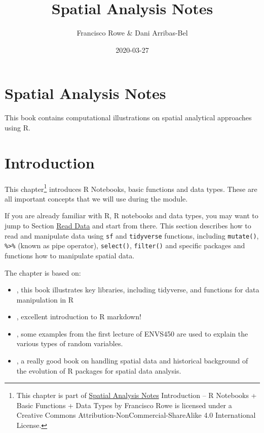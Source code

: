 \documentclass[]{book}
\title{Spatial Analysis Notes}
\author{Francisco Rowe \& Dani Arribas-Bel}
\date{2020-03-27}
\begin{document}
\maketitle

{
\setcounter{tocdepth}{1}
\tableofcontents
}
\chapter{Spatial Analysis Notes}\label{spatial-analysis-notes}

This book contains computational illustrations on spatial analytical
approaches using R.

\chapter{Introduction}\label{intro}

This chapter\footnote{This chapter is part of \href{index.html}{Spatial
  Analysis Notes} {Introduction -- R Notebooks + Basic Functions + Data
  Types} by Francisco Rowe is licensed under a Creative Commons
  Attribution-NonCommercial-ShareAlike 4.0 International License.}
introduces R Notebooks, basic functions and data types. These are all
important concepts that we will use during the module.

If you are already familiar with R, R notebooks and data types, you may
want to jump to Section \protect\hyperlink{sec_readdata}{Read Data} and
start from there. This section describes how to read and manipulate data
using \texttt{sf} and \texttt{tidyverse} functions, including
\texttt{mutate()}, \texttt{\%\textgreater{}\%} (known as pipe operator),
\texttt{select()}, \texttt{filter()} and specific packages and functions
how to manipulate spatial data.

The chapter is based on:

\begin{itemize}
\item
  \citet{grolemund_wickham_2019_book}, this book illustrates key
  libraries, including tidyverse, and functions for data manipulation in
  R
\item
  \citet{Xie_et_al_2019_book}, excellent introduction to R markdown!
\item
  \citet{envs450_2018}, some examples from the first lecture of ENVS450
  are used to explain the various types of random variables.
\item
  \citet{Lovelace_et_al_2020_book}, a really good book on handling
  spatial data and historical background of the evolution of R packages
  for spatial data analysis.
\end{itemize}
\end{document}
